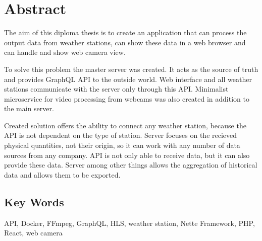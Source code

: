 \chapter*{Abstract}
The aim of this diploma thesis is to create an application that can process the output data from weather stations, can show these data in a web browser and can handle and show web camera view.

To solve this problem the master server was created. It acts as the source of truth and provides GraphQL API to the outside world. Web interface and all weather stations communicate with the server only through this API. Minimalist microservice for video processing from webcams was also created in addition to the main server.

Created solution offers the ability to connect any weather station, because the API is not dependent on the type of station. Server focuses on the recieved physical quantities, not their origin, so it can work with any number of data sources from any company. API is not only able to receive data, but it can also provide these data. Server among other things allows the aggregation of historical data and allows them to be exported.

\vfill

\section*{Key Words}
API, Docker, FFmpeg, GraphQL, HLS, weather station, Nette Framework, PHP, React, web camera
